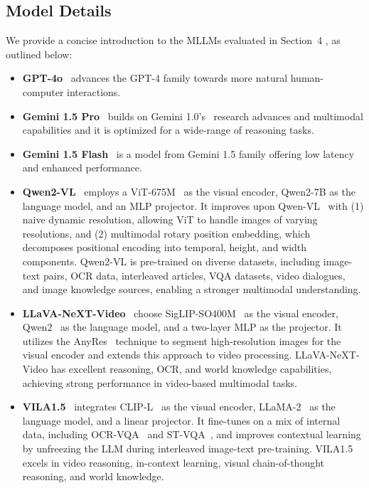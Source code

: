 \subsection{Model Details}
\label{sup:models}
We provide a concise introduction to the MLLMs evaluated in Section~{\color{red}4}%
, as outlined below:
\begin{itemize}
    \item \textbf{GPT-4o}~\cite{achiam2023gpt} advances the GPT-4 family towards more natural human-computer interactions. 
    \item \textbf{Gemini 1.5 Pro}~\cite{reid2024gemini} builds on Gemini 1.0’s~\cite{team2023gemini} research advances and multimodal capabilities and it is optimized for a wide-range of reasoning tasks. 
    \item \textbf{Gemini 1.5 Flash}~\cite{reid2024gemini} is a model from Gemini 1.5 family offering low latency and enhanced performance. 
    \item \textbf{Qwen2-VL}~\cite{wang2024qwen2} employs a ViT-675M~\cite{radford2021learning} as the visual encoder, Qwen2-7B as the language model, and an MLP projector. It improves upon Qwen-VL~\cite{bai2023qwen} with (1) naive dynamic resolution, allowing ViT to handle images of varying resolutions, and (2) multimodal rotary position embedding, which decomposes positional encoding into temporal, height, and width components. Qwen2-VL is pre-trained on diverse datasets, including image-text pairs, OCR data, interleaved articles, VQA datasets, video dialogues, and image knowledge sources, enabling a stronger multimodal understanding.
    \item \textbf{LLaVA-NeXT-Video}~\cite{zhang2024llavanextvideo} choose SigLIP-SO400M~\cite{zhai2023sigmoid} as the visual encoder, Qwen2~\cite{wang2024qwen2} as the language model, and a two-layer MLP as the projector. It utilizes the AnyRes~\cite{liu2024llavanext} technique to segment high-resolution images for the visual encoder and extends this approach to video processing. LLaVA-NeXT-Video has excellent reasoning, OCR, and world knowledge capabilities, achieving strong performance in video-based multimodal tasks.
    \item \textbf{VILA1.5}~\cite{lin2024vila} integrates CLIP-L~\cite{radford2021learning} as the visual encoder, LLaMA-2~\cite{touvron2023llama} as the language model, and a linear projector. It fine-tunes on a mix of internal data, including OCR-VQA~\cite{mishra2019ocr} and ST-VQA~\cite{biten2019scene}, and improves contextual learning by unfreezing the LLM during interleaved image-text pre-training. VILA1.5 excels in video reasoning, in-context learning, visual chain-of-thought reasoning, and world knowledge.

\end{itemize}
